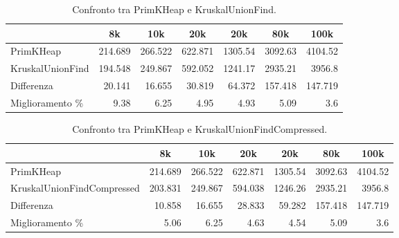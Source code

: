 \begin{table}[H]
\centering
    \begin{tabular}{|l|rrrrrr|}
    \hline
    &  \multicolumn{1}{c}{8k} & \multicolumn{1}{c}{10k} & \multicolumn{1}{c}{20k} & \multicolumn{1}{c}{20k} & \multicolumn{1}{c}{80k} &           \multicolumn{1}{c|}{100k} \\
    \hline
PrimKHeap        & 214.689 & 266.522 & 622.871 & 1305.54  & 3092.63  & 4104.52  \\
KruskalUnionFind & 194.548 & 249.867 & 592.052 & 1241.17  & 2935.21  & 3956.8   \\ \hline
Differenza       &  20.141 &  16.655 &  30.819 &   64.372 &  157.418 &  147.719 \\
Miglioramento \%    &   9.38  &   6.25  &   4.95  &    4.93  &    5.09  &    3.6   \\
    \hline
    \end{tabular}
    \caption{Confronto tra PrimKHeap e KruskalUnionFind.}
    \label{table:prim-k-heap-vs-kruskal-union-find}
\end{table}

\begin{table}[H]
\centering
    \begin{tabular}{|l|rrrrrr|}
    \hline
    &  \multicolumn{1}{c}{8k} & \multicolumn{1}{c}{10k} & \multicolumn{1}{c}{20k} & \multicolumn{1}{c}{20k} & \multicolumn{1}{c}{80k} &           \multicolumn{1}{c|}{100k} \\
    \hline
PrimKHeap                  & 214.689 & 266.522 & 622.871 & 1305.54  & 3092.63  & 4104.52  \\
KruskalUnionFindCompressed & 203.831 & 249.867 & 594.038 & 1246.26  & 2935.21  & 3956.8   \\ \hline
Differenza                 &  10.858 &  16.655 &  28.833 &   59.282 &  157.418 &  147.719 \\
Miglioramento \%           &   5.06  &   6.25  &   4.63  &    4.54  &    5.09  &    3.6   \\
    \hline
    \end{tabular}
    \caption{Confronto tra PrimKHeap e KruskalUnionFindCompressed.}
    \label{table:prim-k-heap-vs-kruskal-union-find-compressed}
\end{table}


